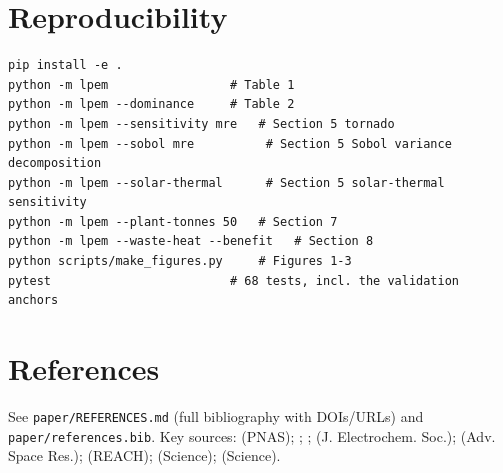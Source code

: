 \documentclass[11pt,a4paper]{article}
\begin{document}
\section{Reproducibility}

\begin{verbatim}
pip install -e .
python -m lpem                 # Table 1
python -m lpem --dominance     # Table 2
python -m lpem --sensitivity mre   # Section 5 tornado
python -m lpem --sobol mre          # Section 5 Sobol variance decomposition
python -m lpem --solar-thermal      # Section 5 solar-thermal sensitivity
python -m lpem --plant-tonnes 50   # Section 7
python -m lpem --waste-heat --benefit   # Section 8
python scripts/make_figures.py     # Figures 1-3
pytest                         # 68 tests, incl. the validation anchors
\end{verbatim}

\section*{References}

See \texttt{paper/REFERENCES.md} (full bibliography with DOIs/URLs) and
\texttt{paper/references.bib}. Key sources: \citet{leger2025} (PNAS);
\citet{taylor1993}; \citet{carr1963}; \citet{allanore2015} (J. Electrochem. Soc.);
\citet{schreiner2016sizing} (Adv. Space Res.); \citet{kornuta2019} (REACH);
\citet{hauch2020} (Science); \citet{colaprete2010} (Science).



\end{document}
